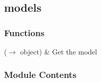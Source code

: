 \documentclass[letterpaper,10pt,english]{sphinxmanual}
\begin{document}
\sphinxstepscope


\subsection{models}
\label{\detokenize{autoapi/models/index:module-models}}\label{\detokenize{autoapi/models/index:models}}\label{\detokenize{autoapi/models/index::doc}}

\subsubsection{Functions}
\label{\detokenize{autoapi/models/index:functions}}

\begin{savenotes}\sphinxattablestart
\sphinxthistablewithglobalstyle
\sphinxthistablewithnovlinesstyle
\centering
\begin{tabulary}{\linewidth}[t]{}
\sphinxtoprule
\sphinxtableatstartofbodyhook
\sphinxAtStartPar
{}(\(\rightarrow\) object)
&
\sphinxAtStartPar
Get the model
\\
\sphinxbottomrule
\end{tabulary}
\sphinxtableafterendhook\par
\sphinxattableend\end{savenotes}


\subsubsection{Module Contents}
\label{\detokenize{autoapi/models/index:module-contents}}
\end{document}
